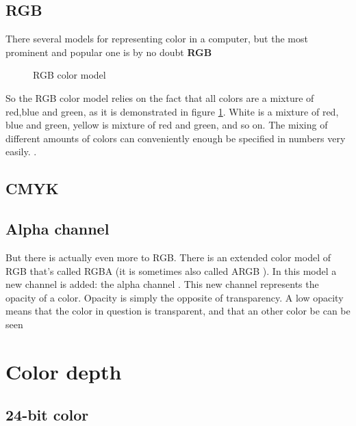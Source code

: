 \subsection{RGB}
\label{sec:rgb}

There several models for representing color in a computer, but the
most prominent and popular one is by no doubt \textbf{RGB} 

\begin{figure}[h]
  \centering
  
  \caption{RGB color model}
  \label{fig:rgb}
\end{figure}

So the RGB color model relies on the fact that all colors are a
mixture of red,blue and green, as it is demonstrated in figure
\ref{fig:rgb}. White is a mixture of red, blue and green, yellow is
mixture of red and green, and so on. The mixing of different amounts
of colors can conveniently enough be specified in numbers very
easily. \cite{porter84_compos_dig_img}.

\subsection{CMYK}
\label{sec:cmyk}

\subsection{Alpha channel}
\label{sec:alpha_chan}


But there is actually even more to RGB. There is an extended color
model of RGB that's called RGBA (it is sometimes also
called ARGB ). In this model a new channel is added: the
alpha channel . This new channel represents the
opacity of a color. Opacity is simply the opposite of transparency.  A
low opacity means that the color in question is transparent,
 and that an other color be can be seen

\section{Color depth}
\label{sec:bit-depth}

\subsection{24-bit color}
\label{sec:24-bit-color}

